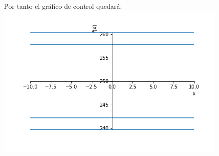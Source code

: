 \documentclass[spanish, 11pt]{exam}
\begin{document}
\begin{questions}
\begin{solution}
    Por tanto el gráfico de control quedará: \\ \includegraphics[scale=0.6]{p71e19.png}   \end{solution}
    \end{questions}
    
\end{document}
